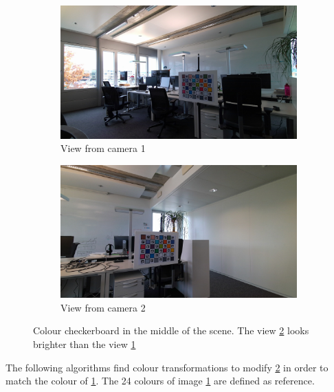 \begin{figure}[H]
\centering
  \begin{subfigure}[b]{0.48 \textwidth}
    \includegraphics[width=\textwidth]{images/visual_enhancement/colour/master_checkerboard_00050.jpg}
    \caption{View from camera 1}
    \label{figure:master_checkerboard_00050}
  \end{subfigure}
  \hfill
  \begin{subfigure}[b]{0.48 \textwidth}
    \includegraphics[width=\textwidth]{images/visual_enhancement/colour/sub_checkerboard_00050.jpg}
    \caption{View from camera 2}
    \label{figure:sub_checkerboard_00050}
  \end{subfigure}
  \caption{Colour checkerboard in the middle of the scene. The view \ref{figure:sub_checkerboard_00050} looks brighter than the view \ref{figure:master_checkerboard_00050} }
  \label{figure:checkerboard_00050}
\end{figure}

The following algorithms find colour transformations to modify \ref{figure:sub_checkerboard_00050} in order to match the colour of \ref{figure:master_checkerboard_00050}. The 24 colours of image \ref{figure:master_checkerboard_00050} are defined as reference.

